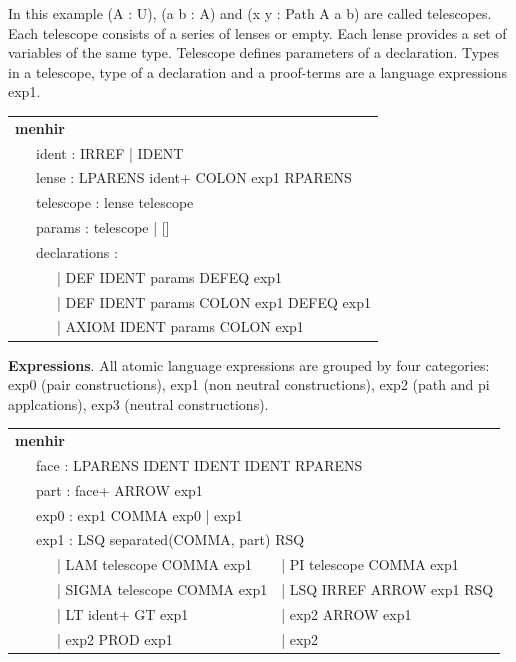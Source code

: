 \documentclass[a4paper,UKenglish,cleveref, autoref, thm-restate]{lipics-v2021}
\newcommand{\tabstyle}[0]{\scriptsize\ttfamily\fontseries{l}\selectfont}
\begin{document}
In this example (A : U), (a b : A) and (x y : Path A a b) are called telescopes.
Each telescope consists of a series of lenses or empty. Each lense provides a
set of variables of the same type. Telescope defines parameters of a declaration.
Types in a telescope, type of a declaration and a proof-terms are a language expressions exp1.

\begin{table}[ht!]
\tabstyle
\begin{tabular}{l}
\textbf{menhir} \\
\ \ \ ident : IRREF | IDENT \\
\ \ \ lense : LPARENS ident+ COLON exp1 RPARENS \\
\ \ \ telescope : lense telescope \\
\ \ \ params : telescope | [] \\
\ \ \ declarations : \\
\ \ \ \ \ \ | DEF IDENT params DEFEQ exp1 \\
\ \ \ \ \ \ | DEF IDENT params COLON exp1 DEFEQ exp1 \\
\ \ \ \ \ \ | AXIOM IDENT params COLON exp1
\end{tabular}
\end{table}

\textbf{Expressions}. All atomic language expressions are grouped by four categories:
exp0 (pair constructions), exp1 (non neutral constructions), exp2 (path and pi applcations),
exp3 (neutral constructions).

\begin{table}[ht!]
\tabstyle
\begin{tabular}{ll}
\textbf{menhir} \\
\multicolumn{2}{l}{\ \ \ face : LPARENS IDENT IDENT IDENT RPARENS } \\
\multicolumn{2}{l}{\ \ \ part : face+ ARROW exp1 } \\
\multicolumn{2}{l}{\ \ \ exp0 : exp1 COMMA exp0 | exp1 } \\
\multicolumn{2}{l}{\ \ \ exp1 : LSQ separated(COMMA, part) RSQ } \\
\ \ \ \ \ \ | LAM telescope COMMA exp1   & | PI telescope COMMA exp1 \\
\ \ \ \ \ \ | SIGMA telescope COMMA exp1 & | LSQ IRREF ARROW exp1 RSQ \\
\ \ \ \ \ \ | LT ident+ GT exp1          & | exp2 ARROW exp1 \\
\ \ \ \ \ \ | exp2 PROD exp1             & | exp2 \\
\end{tabular}
\end{table}
\end{document}
